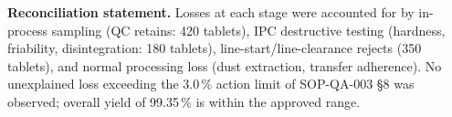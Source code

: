 \begin{tcolorbox}[infobox]
\small \textbf{Reconciliation statement.} Losses at each stage were accounted for by
in-process sampling (QC retains: 420 tablets), IPC destructive testing (hardness,
friability, disintegration: 180 tablets), line-start/line-clearance rejects (350 tablets),
and normal processing loss (dust extraction, transfer adherence). No unexplained loss
exceeding the 3.0\,\% action limit of SOP-QA-003 \S 8 was observed; overall yield of
99.35\,\% is within the approved range.
\end{tcolorbox}

\noindent{}  \quad
{} \\[4pt]
\noindent{}  \quad
{} 
